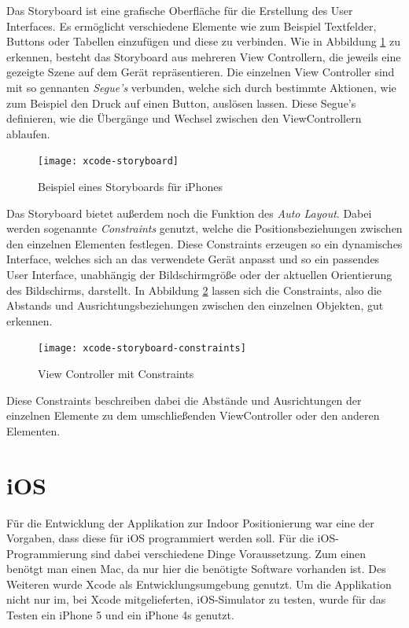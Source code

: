 Das Storyboard ist eine grafische Oberfläche für die Erstellung des User Interfaces. Es ermöglicht verschiedene Elemente wie zum Beispiel Textfelder, Buttons oder Tabellen einzufügen und diese zu verbinden. Wie in Abbildung \ref{xcode-storyboard} zu erkennen, besteht das Storyboard aus mehreren View Controllern, die jeweils eine gezeigte Szene auf dem Gerät repräsentieren. Die einzelnen View Controller sind mit so gennanten \emph{Segue's} verbunden, welche sich durch bestimmte Aktionen, wie zum Beispiel den Druck auf einen Button, auslösen lassen. Diese Segue's definieren, wie die Übergänge und Wechsel zwischen den ViewControllern ablaufen.

\begin{figure}[htb!]
	\centering
	\texttt{[image: xcode-storyboard]}
	\caption{Beispiel eines Storyboards für iPhones}
	\label{xcode-storyboard}
\end{figure}

Das Storyboard bietet außerdem noch die Funktion des \emph{Auto Layout}. Dabei werden sogenannte \emph{Constraints} genutzt, welche die Positionsbeziehungen zwischen den einzelnen Elementen festlegen. Diese Constraints erzeugen so ein dynamisches Interface, welches sich an das verwendete Gerät anpasst und so ein passendes User Interface, unabhängig der Bildschirmgröße oder der aktuellen Orientierung des Bildschirms, darstellt.
In Abbildung \ref{xcode-storyboard-constraints} lassen sich die Constraints, also die Abstands und Ausrichtungsbeziehungen zwischen den einzelnen Objekten, gut erkennen.

\begin{figure}[htb!]
		\centering
	\texttt{[image: xcode-storyboard-constraints]}
	\caption{View Controller mit Constraints}
	\label{xcode-storyboard-constraints}
\end{figure}

Diese Constraints beschreiben dabei die Abstände und Ausrichtungen der einzelnen Elemente zu dem umschließenden ViewController oder den anderen Elementen.


\section{iOS}
\label{sec:technologies:iosandxcode}
Für die Entwicklung der Applikation zur Indoor Positionierung war eine der Vorgaben, dass diese für iOS programmiert werden soll.
Für die iOS-Programmierung sind dabei verschiedene Dinge Voraussetzung. Zum einen benötgt man einen Mac, da nur hier die benötigte Software vorhanden ist. 
Des Weiteren wurde Xcode als Entwicklungsumgebung genutzt. Um die Applikation nicht nur im, bei Xcode mitgelieferten, iOS-Simulator zu testen, wurde für das Testen ein iPhone 5 und ein iPhone 4s genutzt.

